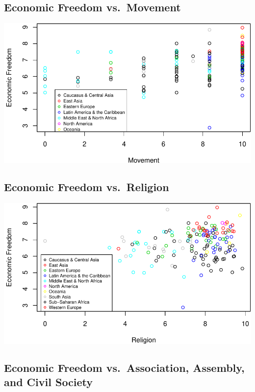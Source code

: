\documentclass[]{article}
\begin{document}
\hypertarget{economic-freedom-vs.movement}{%
\subsection{Economic Freedom
vs.~Movement}\label{economic-freedom-vs.movement}}

\includegraphics{final_presentation_files/figure-latex/unnamed-chunk-5-1.pdf}

\hypertarget{economic-freedom-vs.religion}{%
\subsection{Economic Freedom
vs.~Religion}\label{economic-freedom-vs.religion}}

\includegraphics{final_presentation_files/figure-latex/unnamed-chunk-6-1.pdf}

\hypertarget{economic-freedom-vs.association-assembly-and-civil-society}{%
\subsection{Economic Freedom vs.~Association, Assembly, and Civil
Society}\label{economic-freedom-vs.association-assembly-and-civil-society}}
\end{document}
